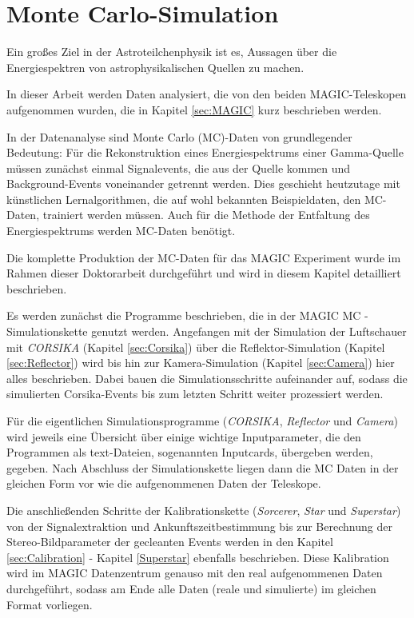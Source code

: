 \chapter{Monte Carlo-Simulation}
Ein großes Ziel in der Astroteilchenphysik ist es, Aussagen über die Energiespektren von astrophysikalischen Quellen zu machen.

In dieser Arbeit werden Daten analysiert, die von den beiden MAGIC-Teleskopen aufgenommen wurden, die in Kapitel \ref{sec:MAGIC} kurz beschrieben werden.

In der Datenanalyse sind Monte Carlo (MC)-Daten von grundlegender Bedeutung:
Für die Rekonstruktion eines Energiespektrums einer Gamma-Quelle müssen zunächst einmal Signalevents, die aus der Quelle kommen und Background-Events voneinander getrennt werden.
Dies geschieht heutzutage mit künstlichen Lernalgorithmen, die auf wohl bekannten Beispieldaten, den MC-Daten, trainiert werden müssen.
Auch für die Methode der Entfaltung des Energiespektrums werden MC-Daten benötigt.

Die komplette Produktion der MC-Daten für das MAGIC Experiment wurde im Rahmen dieser Doktorarbeit durchgeführt und wird in diesem Kapitel detailliert beschrieben.

Es werden zunächst die Programme beschrieben, die in der MAGIC MC - Simulationskette genutzt werden.
Angefangen mit der Simulation der Luftschauer mit \textit{CORSIKA} (Kapitel \ref{sec:Corsika}) über die Reflektor-Simulation (Kapitel \ref{sec:Reflector}) wird bis hin zur Kamera-Simulation (Kapitel \ref{sec:Camera}) hier alles beschrieben.
Dabei bauen die Simulationsschritte aufeinander auf, sodass die simulierten Corsika-Events bis zum letzten Schritt weiter prozessiert werden.

Für die eigentlichen Simulationsprogramme (\textit{CORSIKA}, \textit{Reflector} und \textit{Camera}) wird jeweils eine Übersicht über einige wichtige Inputparameter, die den Programmen als text-Dateien,
sogenannten Inputcards, übergeben werden, gegeben.
Nach Abschluss der Simulationskette liegen dann die MC Daten in der gleichen Form vor wie die aufgenommenen Daten der Teleskope. 

Die anschließenden Schritte der Kalibrationskette (\textit{Sorcerer}, \textit{Star} und \textit{Superstar}) von der Signalextraktion und Ankunftszeitbestimmung bis zur Berechnung der Stereo-Bildparameter der gecleanten Events werden in den Kapitel \ref{sec:Calibration} - Kapitel \ref{Superstar} ebenfalls beschrieben.
Diese Kalibration wird im MAGIC Datenzentrum genauso mit den real aufgenommenen Daten durchgeführt, sodass am Ende alle Daten (reale und simulierte) im gleichen Format vorliegen.

